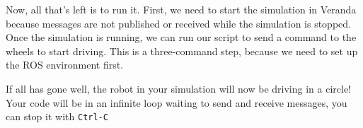 \begin{Shaded}
\begin{Highlighting}[]


\OperatorTok{=}\NormalTok{)}

\OperatorTok{=}\NormalTok{)}
\OperatorTok{=}\NormalTok{)}

\OperatorTok{=}

\OperatorTok{=} 

\OperatorTok{=} 


\end{Highlighting}
\end{Shaded}

Now, all that's left is to run it. First, we need to start the
simulation in Veranda because messages are not published or received
while the simulation is stopped. Once the simulation is running, we can
run our script to send a command to the wheels to start driving. This is
a three-command step, because we need to set up the ROS environment
first.

\begin{Shaded}
\begin{Highlighting}[]
\OperatorTok{\textgreater{}} 
\OperatorTok{\textgreater{}} 
\OperatorTok{\textgreater{}}  
\OperatorTok{\textgreater{}} 
\end{Highlighting}
\end{Shaded}

If all has gone well, the robot in your simulation will now be driving
in a circle! Your code will be in an infinite loop waiting to send and
receive messages, you can stop it with \texttt{Ctrl-C}

